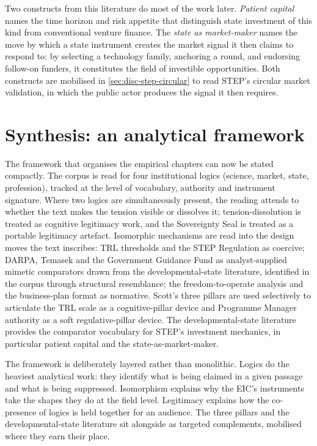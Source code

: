 Two constructs from this literature do most of the work later.
\emph{Patient capital} names the time horizon and risk appetite that
distinguish state investment of this kind from conventional venture
finance. The \emph{state as market-maker} names the move by which a
state instrument creates the market signal it then claims to respond
to: by selecting a technology family, anchoring a round, and
endorsing follow-on funders, it constitutes the field of investible
opportunities. Both constructs are mobilised in
\cref{sec:disc-step-circular} to read STEP's circular market
validation, in which the public actor produces the signal it then
requires.

\section{Synthesis: an analytical framework}
\label{sec:bg-framework}

The framework that organises the empirical chapters can now be stated
compactly. The corpus is read for four institutional logics (science,
market, state, profession), tracked at the level of vocabulary,
authority and instrument signature. Where two logics are simultaneously
present, the reading attends to whether the text makes the tension
visible or dissolves it; tension-dissolution is treated as cognitive
legitimacy work, and the Sovereignty Seal is treated as a portable
legitimacy artefact. Isomorphic mechanisms are read into the design
moves the text inscribes: TRL thresholds and the STEP Regulation as
coercive; DARPA, Temasek and the Government Guidance Fund as
analyst-supplied mimetic comparators drawn from the developmental-state
literature, identified in the corpus through structural resemblance;
the freedom-to-operate analysis and the business-plan format as
normative. Scott's three pillars are used selectively to
articulate the TRL scale as a cognitive-pillar device and Programme
Manager authority as a soft regulative-pillar device. The
developmental-state literature provides the comparator vocabulary for
STEP's investment mechanics, in particular patient capital and the
state-as-market-maker.

The framework is deliberately layered rather than monolithic. Logics
do the heaviest analytical work: they identify what is being claimed
in a given passage and what is being suppressed. Isomorphism explains
why the EIC's instruments take the shapes they do at the field level.
Legitimacy explains how the co-presence of logics is held together for
an audience. The three pillars and the developmental-state literature
sit alongside as targeted complements, mobilised where they earn
their place.


